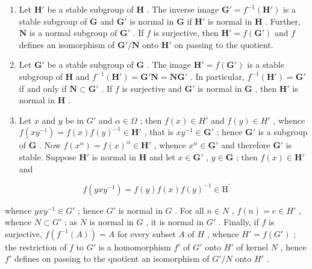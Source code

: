 \begin{enumerate}
\def\labelenumi{(\alph{enumi})}
\item
  Let \(\mathbf{H}'\) be a stable subgroup of \(\mathbf{H}\) . The inverse image \(\mathbf{G}' = f^{-1}(\mathbf{H}')\) is a stable subgroup of \(\mathbf{G}\) and \(\mathbf{G}'\) is normal in \(\mathbf{G}\) if \(\mathbf{H}'\) is normal in \(\mathbf{H}\) . Further, \(\mathbf{N}\) is a normal subgroup of \(\mathbf{G}'\) . If \(f\) is surjective, then \(\mathbf{H}' = f(\mathbf{G}')\) and \(f\) defines an isomorphism of \(\mathbf{G}' / \mathbf{N}\) onto \(\mathbf{H}'\) on passing to the quotient.
\item
  Let \(\mathbf{G}'\) be a stable subgroup of \(\mathbf{G}\) . The image \(\mathbf{H}' = f(\mathbf{G}')\) is a stable subgroup of \(\mathbf{H}\) and \(f^{-1}(\mathbf{H}') = \mathbf{G}'\mathbf{N} = \mathbf{NG}'\) . In particular, \(f^{-1}(\mathbf{H}') = \mathbf{G}'\) if and only if \(\mathbf{N} \subset \mathbf{G}'\) . If \(f\) is surjective and \(\mathbf{G}'\) is normal in \(\mathbf{G}\) , then \(\mathbf{H}'\) is normal in \(\mathbf{H}\) .
\item
  Let \(x\) and \(y\) be in \(G'\) and \(\alpha \in \Omega\) ; then \(f(x) \in H'\) and \(f(y) \in H'\) , whence \(f(xy^{-1}) = f(x)f(y)^{-1} \in \mathbf{H}'\) , that is \(xy^{-1} \in \mathbf{G}'\) ; hence \(\mathbf{G}'\) is a subgroup of \(\mathbf{G}\) . Now \(f(x^{\alpha}) = f(x)^{\alpha} \in \mathbf{H}'\) , whence \(x^{\alpha} \in \mathbf{G}'\) and therefore \(\mathbf{G}'\) is stable. Suppose \(\mathbf{H}'\) is normal in \(\mathbf{H}\) and let \(x \in \mathbf{G}'\) , \(y \in \mathbf{G}\) ; then \(f(x) \in \mathbf{H}'\) and
\end{enumerate}

\[
f (y x y ^ {- 1}) = f (y) f (x) f (y) ^ {- 1} \in \mathrm{H} ^ {\prime}
\]

whence \(yxy^{-1} \in G'\) ; hence \(G'\) is normal in \(G\) . For all \(n \in N\) , \(f(n) = e \in H'\) , whence \(N \subset G'\) ; as \(N\) is normal in \(G\) , it is normal in \(G'\) . Finally, if \(f\) is surjective, \(f(f^{-1}(A)) = A\) for every subset \(A\) of \(H\) , whence \(H' = f(G')\) ; the restriction of \(f\) to \(G'\) is a homomorphism \(f'\) of \(G'\) onto \(H'\) of kernel \(N\) , hence \(f'\) defines on passing to the quotient an isomorphism of \(G'/N\) onto \(H'\) .

